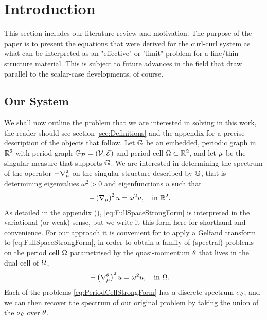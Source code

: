 \section{Introduction} \label{sec:Intro}

This section includes our literature review and motivation.
The purpose of the paper is to present the equations that were derived for the curl-curl system as what can be interpreted as an "effective" or "limit" problem for a fine/thin-structure material.
This is subject to future advances in the field that draw parallel to the scalar-case developments, of course.

\subsection{Our System} \label{ssec:OurSystem}
We shall now outline the problem that we are interested in solving in this work, the reader should see section \ref{sec:Definitions} and the appendix  for a precise description of the objects that follow.
Let $\mathbb{G}$ be an embedded, periodic graph in $\mathbb{R}^2$ with period graph $\mathbb{G}_{\mathcal{P}}=\left( \mathcal{V}, \mathcal{E} \right)$ and period cell $\Omega\subset\mathbb{R}^2$, and let $\mu$ be the singular measure that supports $\mathbb{G}$.
We are interested in determining the spectrum of the operator $-\nabla_{\mu}^2$ on the singular structure described by $\mathbb{G}$, that is determining eigenvalues $\omega^2>0$ and eigenfunctions $u$ such that
\begin{align} \label{eq:FullSpaceStrongForm}
	- \left(  \nabla_{\mu}  \right)^2 u &= \omega^2 u, \quad \text{in } \mathbb{R}^2.
\end{align}
As detailed in the appendix (), \eqref{eq:FullSpaceStrongForm} is interpreted in the variational (or weak) sense, but we write it this form here for shorthand and convenience.
For our approach it is convenient for to apply a Gelfand transform to \eqref{eq:FullSpaceStrongForm}, in order to obtain a family of (spectral) problems on the period cell $\Omega$ parametrised by the quasi-momentum $\theta$ that lives in the dual cell of $\Omega$, 
\begin{align} \label{eq:PeriodCellStrongForm}
	- \left(  \nabla^{\theta}_{\mu}  \right)^2 u &= \omega^2 u, \quad \text{in } \Omega.
\end{align}
Each of the problems \eqref{eq:PeriodCellStrongForm} has a discrete spectrum $\sigma_{\theta}$, and we can then recover the spectrum of our original problem by taking the union of the $\sigma_{\theta}$ over $\theta$.
